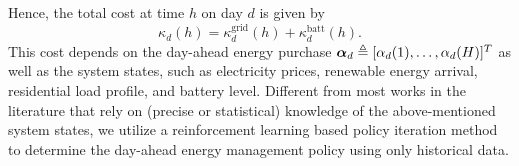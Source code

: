 Hence, the total cost at time $h$ on day $d$ is given by
\begin{equation}\label{eq: total cost}
    \kappa_d(h) = \kappa^\text{grid}_d(h) + \kappa^\text{batt}_d(h).
\end{equation}
This cost depends on the day-ahead energy purchase $\boldsymbol{\alpha}_d\triangleq [\alpha_d(1),\ldots, \alpha_d(H)]^T$ as well as the system states, such as electricity prices, renewable energy arrival, residential load profile, and battery level. Different from most works in the literature that rely on (precise or statistical) knowledge of the above-mentioned system states, we utilize a reinforcement learning based policy iteration method to determine the day-ahead energy management policy using only historical data.
